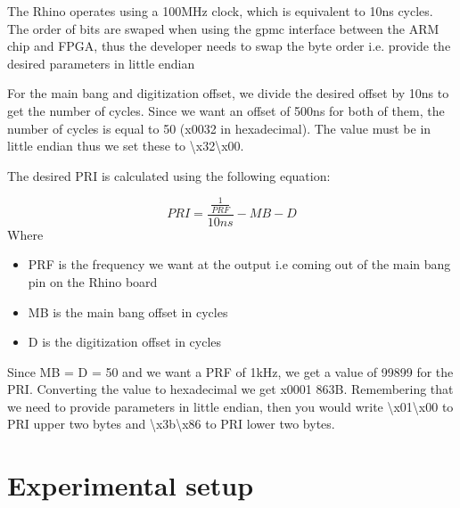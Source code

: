 \documentclass[12pt, a4paper]{article}
\begin{document}


The Rhino operates using a 100MHz clock, which is equivalent to 10ns cycles. The order of bits are swaped when using the gpmc interface between the ARM chip and FPGA, thus the developer needs to swap the byte order i.e. provide the desired parameters in little endian

For the main bang and digitization offset, we divide the desired offset by 10ns to get the number of cycles. Since we want an offset of 500ns for both of them, the number of cycles is equal to 50 (x0032 in hexadecimal). The value must be in little endian thus we set these to \textbackslash x32\textbackslash x00.


The desired PRI is calculated using the following equation:

	\[ 
		PRI = \frac{\frac{1}{PRF}}{10ns} - MB - D
	\]
Where
 
	\begin{itemize}
  		\item PRF is the frequency we want at the output i.e coming out of the main bang pin on the Rhino board
  		\item MB is the main bang offset in cycles
  		\item D is the digitization offset in cycles
	\end{itemize}

Since MB = D = 50 and we want a PRF of 1kHz, we get a value of 99899 for the PRI. Converting the value to hexadecimal we get x0001 863B. Remembering that we need to provide parameters in little endian, then you would write \textbackslash x01\textbackslash x00 to PRI upper two bytes and \textbackslash x3b\textbackslash x86 to PRI lower two bytes.

\section{Experimental setup}
\end{document}
